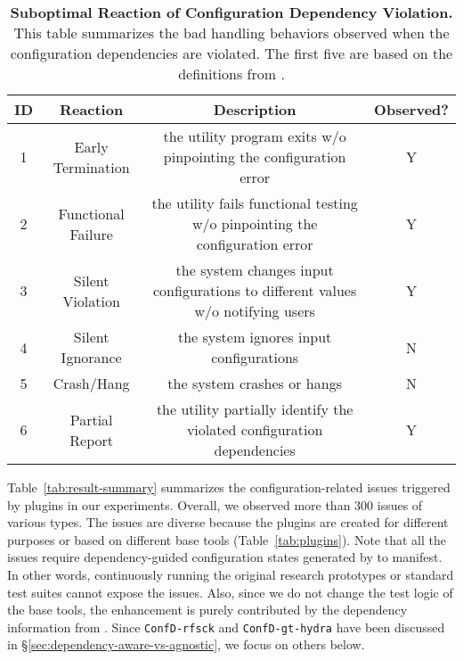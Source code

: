 \begin{table*}[t]
	\small
	\begin{center}
		\begin{tabular}{ c | c | c | c  }
 	\textbf{ID}  & \textbf{Reaction}  & \textbf{Description} & \textbf{Observed?}     \\
          \hline
 1   & Early Termination   & the  utility program exits w/o pinpointing the configuration error &  Y \\
			\hline
		 2    & Functional Failure  & the utility fails functional testing w/o pinpointing the configuration error &   Y \\
	\hline
  3  &  Silent Violation & the system changes input configurations to different values w/o notifying users & Y \\
			\hline
 4    &  Silent Ignorance  & the system  ignores input configurations & N   \\
			\hline
  5    & Crash/Hang  & the system crashes or hangs  & N   \\
			\hline		
6    &  Partial Report  & the utility  partially identify the violated configuration dependencies  & Y    \\
			\hline
		\end{tabular}
	\end{center}

	\caption{ {\bf Suboptimal Reaction of Configuration Dependency Violation.}  This table summarizes the bad handling behaviors observed when the  configuration dependencies are violated. The first five   are based on the definitions from    \cite{spex}.  
}
	\label{tab:handling}
\end{table*}

Table~\ref{tab:result-summary} summarizes 
the configuration-related issues triggered by \prj plugins in our experiments. Overall, we  observed more than 300   issues of various types.
The issues are diverse because the plugins are created for different purposes  or based on different base tools  (Table~\ref{tab:plugins}). 
Note that all the issues require   dependency-guided configuration states generated by \prj to manifest. In other words, continuously running the original research prototypes or standard test suites cannot expose the issues.
Also, since we do not change  the test logic of the base tools,  the enhancement  is purely contributed by the dependency information from \prj. Since   \texttt{ConfD-rfsck} and  \texttt{ConfD-gt-hydra} have been discussed in \S\ref{sec:dependency-aware-vs-agnostic}, we focus on others  below.


